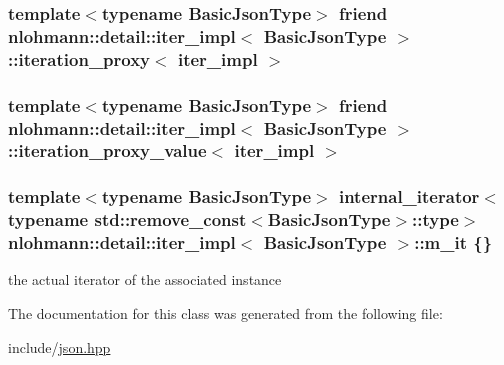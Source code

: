 \subsubsection[{\texorpdfstring{iteration\+\_\+proxy$<$ iter\+\_\+impl $>$}{iteration_proxy< iter_impl >}}]{\setlength{\rightskip}{0pt plus 5cm}template$<$typename Basic\+Json\+Type$>$ friend {\bf nlohmann\+::detail\+::iter\+\_\+impl}$<$ {\bf Basic\+Json\+Type} $>$\+::{\bf iteration\+\_\+proxy}$<$ {\bf iter\+\_\+impl} $>$\hspace{0.3cm}{\ttfamily [private]}}\hypertarget{classnlohmann_1_1detail_1_1iter__impl_a28328d17a18d9754c89c5c8159677a6f}{}\label{classnlohmann_1_1detail_1_1iter__impl_a28328d17a18d9754c89c5c8159677a6f}
\subsubsection[{\texorpdfstring{iteration\+\_\+proxy\+\_\+value$<$ iter\+\_\+impl $>$}{iteration_proxy_value< iter_impl >}}]{\setlength{\rightskip}{0pt plus 5cm}template$<$typename Basic\+Json\+Type$>$ friend {\bf nlohmann\+::detail\+::iter\+\_\+impl}$<$ {\bf Basic\+Json\+Type} $>$\+::{\bf iteration\+\_\+proxy\+\_\+value}$<$ {\bf iter\+\_\+impl} $>$\hspace{0.3cm}{\ttfamily [private]}}\hypertarget{classnlohmann_1_1detail_1_1iter__impl_ac501dc2374b4d17a884fc9a656e80d5a}{}\label{classnlohmann_1_1detail_1_1iter__impl_ac501dc2374b4d17a884fc9a656e80d5a}
\subsubsection[{\texorpdfstring{m\+\_\+it}{m_it}}]{\setlength{\rightskip}{0pt plus 5cm}template$<$typename Basic\+Json\+Type$>$ {\bf internal\+\_\+iterator}$<$typename std\+::remove\+\_\+const$<${\bf Basic\+Json\+Type}$>$\+::type$>$ {\bf nlohmann\+::detail\+::iter\+\_\+impl}$<$ {\bf Basic\+Json\+Type} $>$\+::m\+\_\+it \{\}}\hypertarget{classnlohmann_1_1detail_1_1iter__impl_a8a86a7c0d4af0cc4ab345b6f0e13cdfa}{}\label{classnlohmann_1_1detail_1_1iter__impl_a8a86a7c0d4af0cc4ab345b6f0e13cdfa}


the actual iterator of the associated instance 



The documentation for this class was generated from the following file\+:\begin{DoxyCompactItemize}
\item 
include/\hyperlink{json_8hpp}{json.\+hpp}\end{DoxyCompactItemize}
